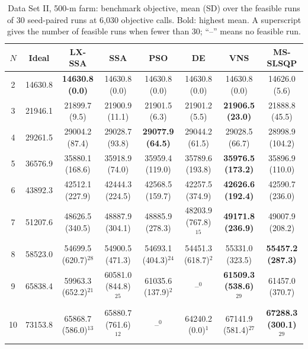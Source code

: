 \begin{table}[!t]
\centering
\caption{Data Set II, 500-m farm: benchmark objective, mean (SD) over the feasible runs of 30 seed-paired runs at 6,030 objective calls. Bold: highest mean. A superscript gives the number of feasible runs when fewer than 30; ``--'' means no feasible run.}
\label{tab:res-2-500}
\scriptsize\setlength{\tabcolsep}{3pt}
\begin{tabular}{cccccccc}
\toprule
$N$ & Ideal & LX-SSA & SSA & PSO & DE & VNS & MS-SLSQP \\
\midrule
2 & 14630.8 & \textbf{14630.8 (0.0)} & 14630.8 (0.0) & 14630.8 (0.0) & 14630.8 (0.0) & 14630.8 (0.0) & 14626.0 (5.6) \\
3 & 21946.1 & 21899.7 (9.5) & 21900.9 (11.1) & 21901.5 (6.3) & 21901.2 (5.5) & \textbf{21906.5 (23.0)} & 21888.8 (45.5) \\
4 & 29261.5 & 29004.2 (87.4) & 29028.7 (93.8) & \textbf{29077.9 (64.5)} & 29044.2 (61.5) & 29028.5 (66.7) & 28998.9 (104.2) \\
5 & 36576.9 & 35880.1 (168.6) & 35918.9 (74.0) & 35959.4 (119.0) & 35789.6 (193.8) & \textbf{35976.5 (173.2)} & 35896.9 (110.0) \\
6 & 43892.3 & 42512.1 (227.9) & 42444.3 (224.5) & 42568.5 (159.7) & 42257.5 (374.9) & \textbf{42626.6 (192.4)} & 42590.7 (236.0) \\
7 & 51207.6 & 48626.5 (340.5) & 48887.9 (304.1) & 48885.9 (278.3) & 48203.9 (767.8)$^{15}$ & \textbf{49171.8 (236.9)} & 49007.9 (208.2) \\
8 & 58523.0 & 54699.5 (620.7)$^{28}$ & 54900.5 (471.3) & 54693.1 (404.3)$^{24}$ & 54451.3 (618.7)$^{2}$ & 55331.0 (323.5) & \textbf{55457.2 (287.3)} \\
9 & 65838.4 & 59963.3 (652.2)$^{21}$ & 60581.0 (844.8)$^{25}$ & 61035.6 (137.9)$^{2}$ & --$^{0}$ & \textbf{61509.3 (538.6)}$^{29}$ & 61457.0 (370.7) \\
10 & 73153.8 & 65868.7 (586.0)$^{13}$ & 65880.7 (761.6)$^{12}$ & --$^{0}$ & 64240.2 (0.0)$^{1}$ & 67141.9 (581.4)$^{27}$ & \textbf{67288.3 (300.1)}$^{29}$ \\
\bottomrule
\end{tabular}
\end{table}

